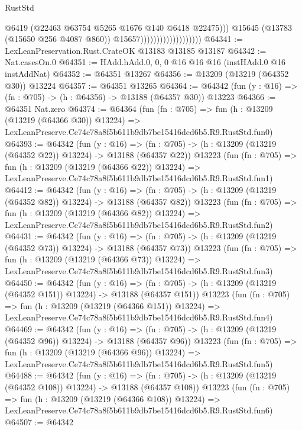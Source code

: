 \begin{lexlean}{RustStd}
\begin{coremodule}
                                              @6419
                                              (@22463 @63754 @5265 @1676 @140 @6418 @22475)))
                                          @15645
                                          (@13783 (@15650 @256 @4087 @860))
                                          @15657)))))))))))))))))))
@64341 := LexLeanPreservation.Rust.CrateOK @13183 @13185 @13187
@64342 := Nat.casesOn.{0}
@64351 := HAdd.hAdd.{0, 0, 0} @16 @16 @16 (instHAdd.{0} @16 instAddNat)
@64352 := @64351 @13267
@64356 := @13209 (@13219 (@64352 @30)) @13224
@64357 := @64351 @13265
@64364 := @64342 (fun (y : @16) => (fn : @705) -> (h : @64356) -> @13188 (@64357 @30)) @13223
@64366 := @64351 Nat.zero
@64374 := @64364
    (fun (fn : @705) =>
    fun (h : @13209 (@13219 (@64366 @30)) @13224) =>
    LexLeanPreserve.Ce74c78a8f5b611b9db7be15416dcd6b5.R9.RustStd.fun0)
@64393 := @64342
    (fun (y : @16) =>
    (fn : @705) -> (h : @13209 (@13219 (@64352 @22)) @13224) -> @13188 (@64357 @22))
    @13223
    (fun (fn : @705) =>
    fun (h : @13209 (@13219 (@64366 @22)) @13224) =>
    LexLeanPreserve.Ce74c78a8f5b611b9db7be15416dcd6b5.R9.RustStd.fun1)
@64412 := @64342
    (fun (y : @16) =>
    (fn : @705) -> (h : @13209 (@13219 (@64352 @82)) @13224) -> @13188 (@64357 @82))
    @13223
    (fun (fn : @705) =>
    fun (h : @13209 (@13219 (@64366 @82)) @13224) =>
    LexLeanPreserve.Ce74c78a8f5b611b9db7be15416dcd6b5.R9.RustStd.fun2)
@64431 := @64342
    (fun (y : @16) =>
    (fn : @705) -> (h : @13209 (@13219 (@64352 @73)) @13224) -> @13188 (@64357 @73))
    @13223
    (fun (fn : @705) =>
    fun (h : @13209 (@13219 (@64366 @73)) @13224) =>
    LexLeanPreserve.Ce74c78a8f5b611b9db7be15416dcd6b5.R9.RustStd.fun3)
@64450 := @64342
    (fun (y : @16) =>
    (fn : @705) -> (h : @13209 (@13219 (@64352 @151)) @13224) -> @13188 (@64357 @151))
    @13223
    (fun (fn : @705) =>
    fun (h : @13209 (@13219 (@64366 @151)) @13224) =>
    LexLeanPreserve.Ce74c78a8f5b611b9db7be15416dcd6b5.R9.RustStd.fun4)
@64469 := @64342
    (fun (y : @16) =>
    (fn : @705) -> (h : @13209 (@13219 (@64352 @96)) @13224) -> @13188 (@64357 @96))
    @13223
    (fun (fn : @705) =>
    fun (h : @13209 (@13219 (@64366 @96)) @13224) =>
    LexLeanPreserve.Ce74c78a8f5b611b9db7be15416dcd6b5.R9.RustStd.fun5)
@64488 := @64342
    (fun (y : @16) =>
    (fn : @705) -> (h : @13209 (@13219 (@64352 @108)) @13224) -> @13188 (@64357 @108))
    @13223
    (fun (fn : @705) =>
    fun (h : @13209 (@13219 (@64366 @108)) @13224) =>
    LexLeanPreserve.Ce74c78a8f5b611b9db7be15416dcd6b5.R9.RustStd.fun6)
@64507 := @64342

\end{coremodule}
\end{lexlean}
